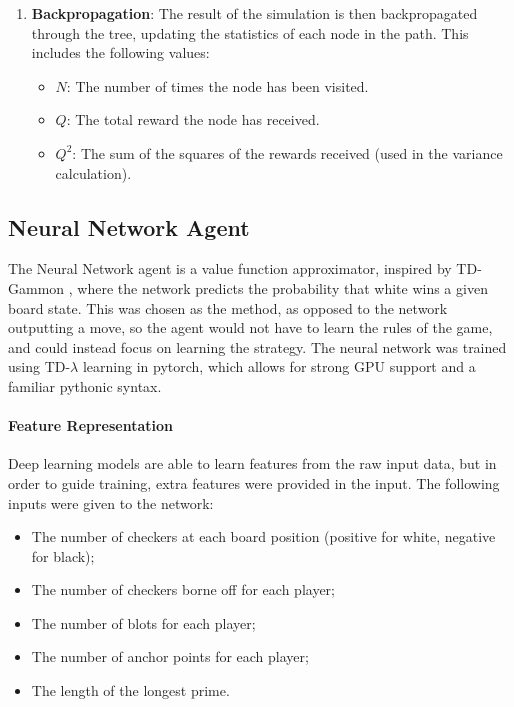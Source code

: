 \begin{enumerate}
    \item \textbf{Backpropagation}: The result of the simulation is then backpropagated through the tree, updating the statistics of each node in the path. This includes the following values:
    \begin{itemize}
        \item $N$: The number of times the node has been visited.
        \item $Q$: The total reward the node has received.
        \item $Q^2$: The sum of the squares of the rewards received (used in the variance calculation).
    \end{itemize}
\end{enumerate}


\subsection{Neural Network Agent}
\label{sec:neural}
The Neural Network agent is a value function approximator, inspired by TD-Gammon \cite{Tesauro1995}, where the network predicts the probability that white wins a given board state. 
This was chosen as the method, as opposed to the network outputting a move, so the agent would not have to learn the rules of the game, and could instead focus on learning the strategy. The neural network was trained using TD-$\lambda$ learning in pytorch, which allows for strong GPU support and a familiar pythonic syntax.


\paragraph{Feature Representation}
Deep learning models are able to learn features from the raw input data, but in order to guide training, extra features were provided in the input. The following inputs were given to the network:
\begin{itemize}
    \item The number of checkers at each board position (positive for white, negative for black);
    \item The number of checkers borne off for each player;
    \item The number of blots for each player;
    \item The number of anchor points for each player;
    \item The length of the longest prime.
\end{itemize}

